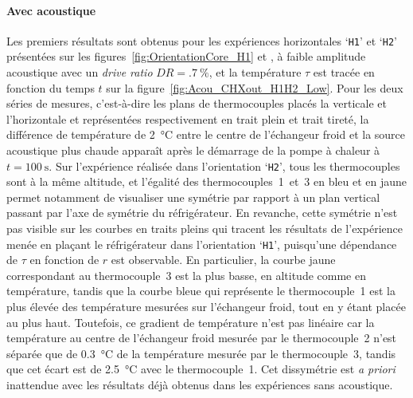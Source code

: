 \paragraph{Avec acoustique}\label{chap:Acou_CHXout_H1H2_low}
Les premiers résultats sont obtenus pour les expériences horizontales `\texttt{H1}' et `\texttt{H2}' présentées sur les figures~\ref{fig:OrientationCore_H1} et , à faible amplitude acoustique avec un \textit{drive ratio} $DR=\qty{.7}{\percent}$, et la température $\tau$ est tracée en fonction du temps $t$ sur la figure~\ref{fig:Acou_CHXout_H1H2_Low}. Pour les deux séries de mesures, c'est-à-dire les plans de thermocouples placés la verticale et l'horizontale et représentées respectivement en trait plein et trait tireté, la différence de température de \qty{2}{\degreeCelsius} entre le centre de l'échangeur froid et la source acoustique plus chaude apparaît après le démarrage de la pompe à chaleur à $t=\qty{100}{\second}$. Sur l'expérience réalisée dans l'orientation `\texttt{H2}', tous les thermocouples sont à la même altitude, et l'égalité des thermocouples~1~et~3 en bleu et en jaune permet notamment de visualiser une symétrie par rapport à un plan vertical passant par l'axe de symétrie du réfrigérateur. En revanche, cette symétrie n'est pas visible sur les courbes en traits pleins qui tracent les résultats de l'expérience menée en plaçant le réfrigérateur dans l'orientation `\texttt{H1}', puisqu'une dépendance de $\tau$ en fonction de $r$ est observable. En particulier, la courbe jaune correspondant au thermocouple~3 est la plus basse, en altitude comme en température, tandis que la courbe bleue qui représente le thermocouple~1 est la plus élevée des température mesurées sur l'échangeur froid, tout en y étant placée au plus haut. Toutefois, ce gradient de température n'est pas linéaire car la température au centre de l'échangeur froid mesurée par le thermocouple~2 n'est séparée que de \qty{.3}{\degreeCelsius} de la température mesurée par le thermocouple~3, tandis que cet écart est de \qty{2.5}{\degreeCelsius} avec le thermocouple~1. Cet dissymétrie est \textit{a priori} inattendue avec les résultats déjà obtenus dans les expériences sans acoustique.
\smallskip


